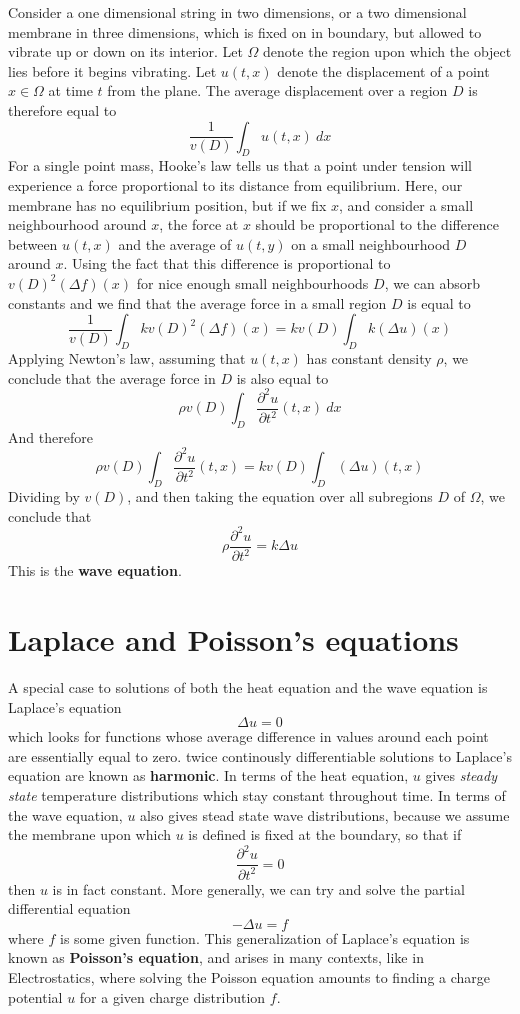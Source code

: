 Consider a one dimensional string in two dimensions, or a two dimensional membrane in three dimensions, which is fixed on in boundary, but allowed to vibrate up or down on its interior. Let $\Omega$ denote the region upon which the object lies before it begins vibrating. Let $u(t,x)$ denote the displacement of a point $x \in \Omega$ at time $t$ from the plane. The average displacement over a region $D$ is therefore equal to
%
\[ \frac{1}{v(D)} \int_D u(t,x)\ dx \]
%
For a single point mass, Hooke's law tells us that a point under tension will experience a force proportional to its distance from equilibrium. Here, our membrane has no equilibrium position, but if we fix $x$, and consider a small neighbourhood around $x$, the force at $x$ should be proportional to the difference between $u(t,x)$ and the average of $u(t,y)$ on a small neighbourhood $D$ around $x$. Using the fact that this difference is proportional to $v(D)^2 (\Delta f)(x)$ for nice enough small neighbourhoods $D$, we can absorb constants and we find that the average force in a small region $D$ is equal to
%
\[ \frac{1}{v(D)} \int_D k v(D)^2 (\Delta f)(x) = kv(D) \int_D k (\Delta u)(x) \]
%
Applying Newton's law, assuming that $u(t,x)$ has constant density $\rho$, we conclude that the average force in $D$ is also equal to
%
\[ \rho v(D) \int_D \frac{\partial^2 u}{\partial t^2}(t,x) \ dx \]
%
And therefore
%
\[ \rho v(D) \int_D \frac{\partial^2 u}{\partial t^2}(t,x) = k v(D) \int_D (\Delta u)(t,x) \]
%
Dividing by $v(D)$, and then taking the equation over all subregions $D$ of $\Omega$, we conclude that
%
\[ \rho \frac{\partial^2 u}{\partial t^2} = k \Delta u \]
%
This is the {\bf wave equation}.

\section{Laplace and Poisson's equations}

A special case to solutions of both the heat equation and the wave equation is Laplace's equation
%
\[ \Delta u = 0 \]
%
which looks for functions whose average difference in values around each point are essentially equal to zero. twice continously differentiable solutions to Laplace's equation are known as {\bf harmonic}. In terms of the heat equation, $u$ gives {\it steady state} temperature distributions which stay constant throughout time. In terms of the wave equation, $u$ also gives stead state wave distributions, because we assume the membrane upon which $u$ is defined is fixed at the boundary, so that if
%
\[ \frac{\partial^2 u}{\partial t^2} = 0 \]
%
then $u$ is in fact constant. More generally, we can try and solve the partial differential equation
%
\[ - \Delta u = f \]
%
where $f$ is some given function. This generalization of Laplace's equation is known as {\bf Poisson's equation}, and arises in many contexts, like in Electrostatics, where solving the Poisson equation amounts to finding a charge potential $u$ for a given charge distribution $f$.

